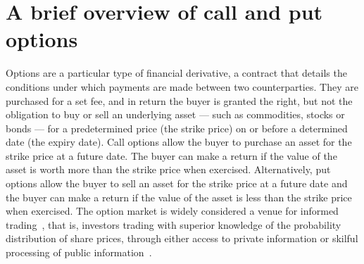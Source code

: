 \section{A brief overview of call and put options}

Options are a particular type of financial derivative, a contract that details the conditions under which payments are made between two counterparties. They are purchased for a set fee, and in return the buyer is granted the right, but not the obligation to buy or sell an underlying asset --- such as commodities, stocks or bonds --- for a predetermined price (the strike price) on or before a determined date (the expiry date).
\nline{}
Call options allow the buyer to purchase an asset for the strike price at a future date. The buyer can make a return if the value of the asset is worth more than the strike price when exercised. Alternatively, put options allow the buyer to sell an asset for the strike price at a future date and the buyer can make a return if the value of the asset is less than the strike price when exercised.
\nline{}
The option market is widely considered a venue for informed trading~\cite{li2021effect,hu2014,chak2004}, that is, investors trading with superior knowledge of the probability distribution of share prices, through either access to private information or skilful processing of public information~\cite{grossman1975application}. 

